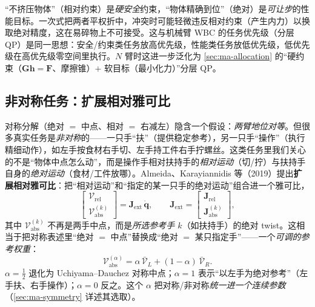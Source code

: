 \begin{insight}
“不挤压物体”（相对约束）是\emph{硬安全}约束，“物体精确到位”（绝对）是\emph{可让步}的性能目标。一次式把两者平权折中，冲突时可能轻微违反相对约束（产生内力）以换取绝对精度，这在易碎物上不可接受。这与机械臂 WBC 的任务优先级（分层 QP）是同一思想：安全/约束类任务放高优先级，性能类任务放低优先级，低优先级在高优先级零空间里执行。$N$ 臂时这进一步泛化为 \cref{sec:ma-allocation} 的“硬约束（$\mathbf{G}\mathbf{h}=\mathbf{F}$、摩擦锥）$+$ 软目标（最小化力）”分层 QP。
\end{insight}

\subsection{非对称任务：扩展相对雅可比}
\label{sec:ma-extjac}

对称分解（绝对 $=$ 中点、相对 $=$ 右减左）隐含一个假设：\emph{两臂地位对等}。但很多真实任务是\emph{非对称}的——一只手“扶”（提供稳定参考），另一只手“操作”（执行精细动作），如左手按食材右手切、左手持工件右手拧螺丝。这类任务里我们关心的不是“物体中点怎么动”，而是操作手相对扶持手的\emph{相对运动}（切/拧）与扶持手自身的\emph{绝对运动}（食材/工件放哪）。Almeida、Karayiannidis 等（2019）提出\textbf{扩展相对雅可比}\cite{almeida2019asymmetric}：把“相对运动”和“指定的某一只手的绝对运动”组合进一个雅可比，
\begin{equation}
  \begin{bmatrix}\boldsymbol{\mathcal{V}}_{\text{rel}}\\ \boldsymbol{\mathcal{V}}_{\text{abs}}^{(k)}\end{bmatrix}=\mathbf{J}_{\text{ext}}\,\dot{\mathbf{q}},
  \qquad
  \mathbf{J}_{\text{ext}}=\begin{bmatrix}\mathbf{J}_{\text{rel}}\\ \mathbf{J}_{\text{abs}}^{(k)}\end{bmatrix},
  \label{eq:ma-extjac}
\end{equation}
其中 $\boldsymbol{\mathcal{V}}_{\text{abs}}^{(k)}$ 不再是两手中点，而是\emph{所选参考手 $k$}（如扶持手）的绝对 twist。这相当于把对称表述里“绝对 $=$ 中点”替换成“绝对 $=$ 某只指定手”——一个\emph{可调的参考权重}：
\begin{equation}
  \boldsymbol{\mathcal{V}}_{\text{abs}}^{(\alpha)}=\alpha\,\bar{\boldsymbol{\mathcal{V}}}_L+(1-\alpha)\,\bar{\boldsymbol{\mathcal{V}}}_R.
  \label{eq:ma-alpha}
\end{equation}
$\alpha=\tfrac12$ 退化为 Uchiyama--Dauchez 对称中点；$\alpha=1$ 表示“以左手为绝对参考”（左手扶、右手操作）；$\alpha=0$ 反之。这个 $\alpha$ 把对称/非对称\emph{统一进一个连续参数}（\cref{sec:ma-symmetry} 详述其选取）。

